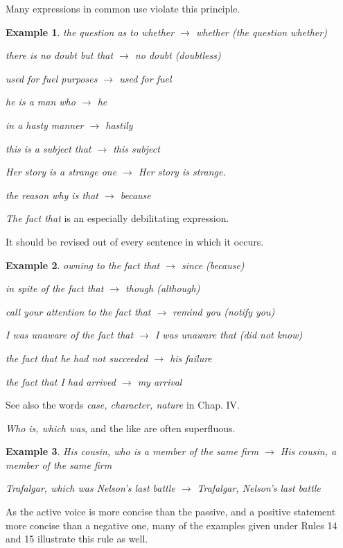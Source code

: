 \documentclass{book}
\numberwithin{equation}{section}
\newtheorem{example}{Example}[chapter]
\begin{document}
%
Many expressions in common use violate this principle.
\begin{example}
    the question as to whether $\to$ whether (the question whether)
    
    there is no doubt but that $\to$ no doubt (doubtless)
    
    used for fuel purposes $\to$ used for fuel
    
    he is a man who $\to$ he
    
    in a hasty manner $\to$ hastily
    
    this is a subject that $\to$ this subject
    
    Her story is a strange one $\to$ Her story is strange.
    
    the reason why is that $\to$ because
\end{example}
\textit{The fact that} is an especially debilitating expression.

It should be revised out of every sentence in which it occurs.
\begin{example}
    owning to the fact that $\to$ since (because)
    
    in spite of the fact that $\to$ though (although)
    
    call your attention to the fact that $\to$ remind you (notify you)
    
    I was unaware of the fact that $\to$ I was unaware that (did not know)
    
    the fact that he had not succeeded $\to$ his failure
    
    the fact that I had arrived $\to$ my arrival
\end{example}
See also the words \textit{case, character, nature} in Chap. IV.

\textit{Who is, which was}, and the like are often superfluous.
\begin{example}
    His cousin, who is a member of the same firm $\to$ His cousin, a member of the same firm
    
    Trafalgar, which was Nelson's last battle $\to$ Trafalgar, Nelson's last battle
\end{example}
As the active voice is more concise than the passive, and a positive statement more concise than a negative one, many of the examples given under Rules 14 and 15 illustrate this rule as well.
\end{document}
